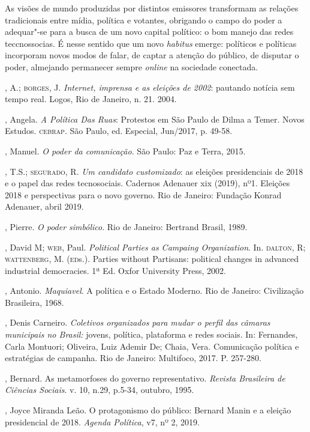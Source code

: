 As visões de mundo produzidas por distintos emissores transformam as
relações tradicionais entre mídia, política e votantes, obrigando o
campo do poder a adequar"-se para a busca de um novo capital político: o
bom manejo das redes teccnossocias. É nesse sentido que um novo
\emph{habitus} emerge: políticos e políticas incorporam novos modos de
falar, de captar a atenção do público, de disputar o poder, almejando
permanecer sempre \emph{online} na sociedade conectada.


\begin{bibliohedra}
, A.; \textsc{borges}, J. \emph{Internet, imprensa e as eleições de 2002}:
pautando notícia sem tempo real. Logos, Rio de Janeiro, n. 21. 2004.

, Angela. \emph{A Política Das Ruas}: Protestos em São Paulo de
Dilma a Temer. Novos Estudos. \textsc{cebrap}. São Paulo, ed. Especial, Jun/2017,
p. 49-58.

, Manuel. \emph{O poder da comunicação}. São Paulo: Paz e
Terra, 2015.

, T.S.; \textsc{segurado}, R. \emph{Um candidato customizado}: as
eleições presidenciais de 2018 e o papel das redes tecnosociais.
Cadernos Adenauer xix (2019), nº1. Eleições 2018 e perspectivas para o
novo governo. Rio de Janeiro: Fundação Konrad Adenauer, abril 2019.

, Pierre. \emph{O poder simbólico}. Rio de Janeiro: Bertrand
Brasil, 1989.

, David M; \textsc{web}, Paul. \emph{Political Parties as Campaing
Organization}. In. \textsc{dalton}, R; \textsc{wattenberg}, M. (\textsc{ed}s.). Parties without
Partisans: political changes in advanced industrial democracies. 1ª Ed.
Oxfor University Press, 2002.

, Antonio. \emph{Maquiavel}. A política e o Estado Moderno. Rio
de Janeiro: Civilização Brasileira, 1968.

, Denis Carneiro. \emph{Coletivos organizados para mudar o perfil
das câmaras municipais no Brasil:} jovens, política, plataforma e redes
sociais. In: Fernandes, Carla Montuori; Oliveira, Luiz Ademir De; Chaia,
Vera. Comunicação política e estratégias de campanha. Rio de Janeiro:
Multifoco, 2017. P. 257-280.

, Bernard. As metamorfoses do governo representativo.
\emph{Revista Brasileira de Ciências Sociais}. v. 10, n.29, p.5-34,
outubro, 1995.

, Joyce Miranda Leão. O protagonismo do público: Bernard Manin e
a eleição presidencial de 2018. \emph{Agenda Política}, v7, nº 2,
2019.


\end{bibliohedra}
